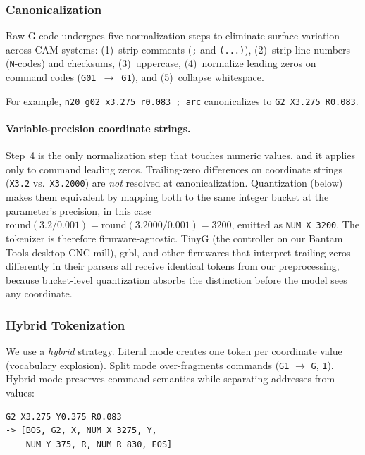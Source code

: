 \documentclass[sensors,article,submit,moreauthors,pdftex]{Definitions/mdpi}
\begin{document}
\subsubsection{Canonicalization}

Raw G-code undergoes five normalization steps to eliminate surface variation across CAM systems: (1)~strip comments (\texttt{;} and \texttt{(...)}), (2)~strip line numbers (\texttt{N}-codes) and checksums, (3)~uppercase, (4)~normalize leading zeros on command codes (\texttt{G01}~$\to$~\texttt{G1}), and (5)~collapse whitespace.

\noindent For example, \texttt{n20 g02 x3.275 r0.083 ; arc} canonicalizes to \texttt{G2 X3.275 R0.083}.

\paragraph{Variable-precision coordinate strings.}
Step~4 is the only normalization step that touches numeric values, and it applies only to command leading zeros. Trailing-zero differences on coordinate strings (\texttt{X3.2} vs.\ \texttt{X3.2000}) are \emph{not} resolved at canonicalization. Quantization (below) makes them equivalent by mapping both to the same integer bucket at the parameter's precision, in this case $\text{round}(3.2 / 0.001) = \text{round}(3.2000 / 0.001) = 3200$, emitted as \texttt{NUM\_X\_3200}. The tokenizer is therefore firmware-agnostic. TinyG (the controller on our Bantam Tools desktop CNC mill), grbl, and other firmwares that interpret trailing zeros differently in their parsers all receive identical tokens from our preprocessing, because bucket-level quantization absorbs the distinction before the model sees any coordinate.

\subsubsection{Hybrid Tokenization}

We use a \emph{hybrid} strategy. Literal mode creates one token per coordinate value (vocabulary explosion). Split mode over-fragments commands (\texttt{G1} $\to$ \texttt{G}, \texttt{1}). Hybrid mode preserves command semantics while separating addresses from values:

\begin{lstlisting}
G2 X3.275 Y0.375 R0.083
-> [BOS, G2, X, NUM_X_3275, Y,
    NUM_Y_375, R, NUM_R_830, EOS]
\end{lstlisting}
\end{document}
